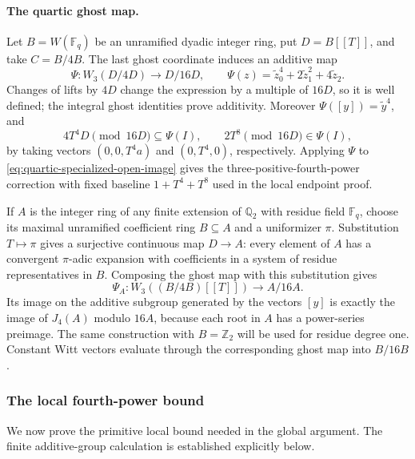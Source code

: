 \documentclass[11pt]{amsart}
\theoremstyle{definition}
\numberwithin{equation}{section}
\begin{document}
\paragraph{The quartic ghost map.}
Let $B=W(\mathbb F_q)$ be an unramified dyadic integer ring, put
$D=B[[T]]$, and take $C=B/4B$.  The last ghost coordinate induces
an additive map
\[
 \Psi:W_3(D/4D)\longrightarrow D/16D,\qquad
 \Psi(z)=\widetilde z_0^4+2\widetilde z_1^2+4\widetilde z_2.
\]
Changes of lifts by $4D$ change the expression by a multiple of $16D$,
so it is well defined; the integral ghost identities prove additivity.
Moreover $\Psi([y])=\widetilde y^4$, and
\[
 4T^4D\pmod{16D}\subseteq\Psi(I),\qquad
 2T^8\pmod{16D}\in\Psi(I),
\]
by taking vectors $(0,0,T^4a)$ and $(0,T^4,0)$, respectively.
Applying $\Psi$ to \eqref{eq:quartic-specialized-open-image} gives
the three-positive-fourth-power correction with fixed baseline
$1+T^4+T^8$ used in the local endpoint proof.

If $A$ is the integer ring of any finite extension of $\mathbb Q_2$
with residue field $\mathbb F_q$, choose its maximal unramified
coefficient ring $B\subseteq A$ and a uniformizer $\pi$.
Substitution $T\mapsto\pi$ gives a surjective continuous map
$D\to A$: every element of $A$ has a convergent $\pi$-adic expansion
with coefficients in a system of residue representatives in $B$.
Composing the ghost map with this substitution gives
\[
 \Psi_A:W_3((B/4B)[[T]])\longrightarrow A/16A.
\]
Its image on the additive subgroup generated by the vectors $[y]$
is exactly the image of $J_4(A)$ modulo $16A$, because each root in
$A$ has a power-series preimage.  The same construction with
$B=\mathbb Z_2$ will be used for residue degree one.  Constant Witt
vectors evaluate through the corresponding ghost map into $B/16B$.

\subsubsection{The local fourth-power bound}
\label{sec:universal-quartic}

We now prove the primitive local bound needed in the global argument.
The finite additive-group calculation is established explicitly below.
\end{document}
